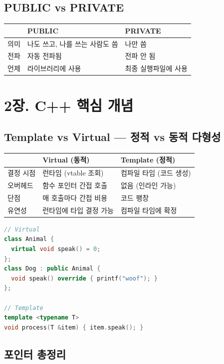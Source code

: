 \documentclass[11pt,a4paper]{article}
\begin{document}
\subsection{PUBLIC vs PRIVATE}
\begin{longtable}{p{3cm}p{5cm}p{5cm}}
\toprule
 & PUBLIC & PRIVATE \\
\midrule
의미 & 나도 쓰고, 나를 쓰는 사람도 씀 & 나만 씀 \\
전파 & 자동 전파됨 & 전파 안 됨 \\
언제 & 라이브러리에 사용 & 최종 실행파일에 사용 \\
\bottomrule
\end{longtable}

\newpage

\section{2장. C++ 핵심 개념}

\subsection{Template vs Virtual --- 정적 vs 동적 다형성}

\begin{longtable}{p{3cm}p{5cm}p{5cm}}
\toprule
 & Virtual (동적) & Template (정적) \\
\midrule
결정 시점 & 런타임 (vtable 조회) & 컴파일 타임 (코드 생성) \\
오버헤드 & 함수 포인터 간접 호출 & 없음 (인라인 가능) \\
단점 & 매 호출마다 간접 비용 & 코드 팽창 \\
유연성 & 런타임에 타입 결정 가능 & 컴파일 타임에 확정 \\
\bottomrule
\end{longtable}

\begin{lstlisting}[language=C++]
// Virtual
class Animal {
  virtual void speak() = 0;
};
class Dog : public Animal {
  void speak() override { printf("woof"); }
};

// Template
template <typename T>
void process(T &item) { item.speak(); }
\end{lstlisting}

\subsection{포인터 총정리}
\end{document}
